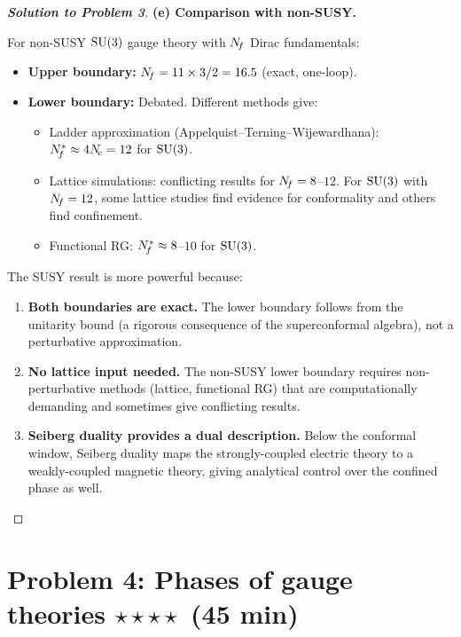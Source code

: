 \documentclass[11pt,a4paper]{article}
\begin{document}
\begin{proof}[\textbf{Solution to Problem 3}]
\textbf{(e) Comparison with non-SUSY.}

For non-SUSY $\mathrm{SU}(3)$ gauge theory with $N_{\!f}$ Dirac fundamentals:
\begin{itemize}
  \item \textbf{Upper boundary:} $N_{\!f} = 11 \times 3/2 = 16.5$
    (exact, one-loop).
  \item \textbf{Lower boundary:} Debated.  Different methods give:
    \begin{itemize}
      \item Ladder approximation (Appelquist--Terning--Wijewardhana):
        $N_{\!f}^* \approx 4N_{\!c} = 12$ for $\mathrm{SU}(3)$.
      \item Lattice simulations: conflicting results for $N_{\!f} = 8$--$12$.
        For $\mathrm{SU}(3)$ with $N_{\!f} = 12$, some lattice studies find evidence
        for conformality and others find confinement.
      \item Functional RG: $N_{\!f}^* \approx 8$--$10$ for $\mathrm{SU}(3)$.
    \end{itemize}
\end{itemize}

The SUSY result is more powerful because:
\begin{enumerate}[label=\arabic*.]
  \item \textbf{Both boundaries are exact.}  The lower boundary follows
    from the unitarity bound (a rigorous consequence of the superconformal
    algebra), not a perturbative approximation.
  \item \textbf{No lattice input needed.}  The non-SUSY lower boundary
    requires non-perturbative methods (lattice, functional RG) that are
    computationally demanding and sometimes give conflicting results.
  \item \textbf{Seiberg duality provides a dual description.}  Below the
    conformal window, Seiberg duality maps the strongly-coupled electric
    theory to a weakly-coupled magnetic theory, giving analytical control
    over the confined phase as well.
\end{enumerate}
\end{proof}

\newpage

\section*{Problem 4: Phases of gauge theories
  \hfill $\star\star\star\star$ \normalsize(45 min)}
\label{prob:phases}
\end{document}
